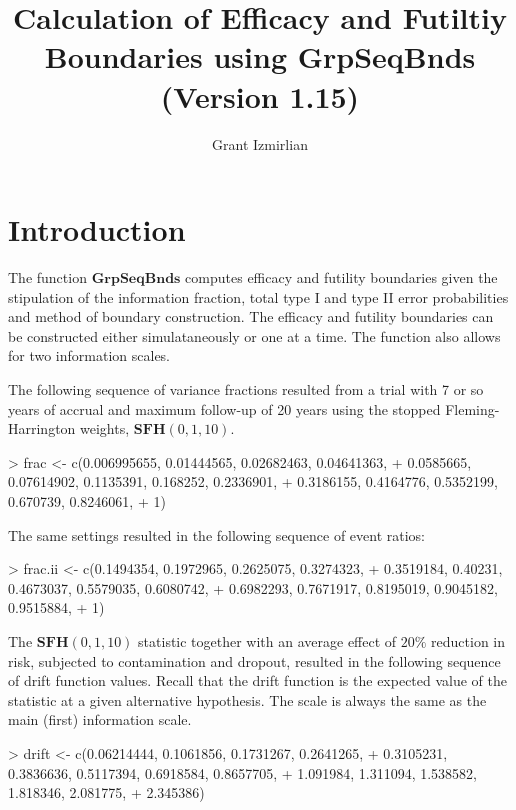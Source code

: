 \documentclass{article}
\begin{document}
\title{Calculation of Efficacy and Futiltiy Boundaries using GrpSeqBnds (Version 1.15)}
\author{Grant Izmirlian}
\maketitle

\section{Introduction}
The function $\mathbf{GrpSeqBnds}$ computes efficacy and futility boundaries given the
stipulation of the information fraction, total type I and type II error probabilities and method
of boundary construction.  The efficacy and futility boundaries can be constructed either
simulataneously or one at a time.  The function also allows for two information scales.



The following sequence of variance fractions resulted from a trial with 7 or so years of accrual
and maximum follow-up of 20 years using the stopped Fleming-Harrington weights, $\mathbf{SFH}(0,1,10)$.
\begin{Schunk}
\begin{Sinput}
> frac <- c(0.006995655, 0.01444565, 0.02682463, 0.04641363, 
+     0.0585665, 0.07614902, 0.1135391, 0.168252, 0.2336901, 
+     0.3186155, 0.4164776, 0.5352199, 0.670739, 0.8246061, 
+     1)
\end{Sinput}
\end{Schunk}

The same settings resulted in the following sequence of event ratios:

\begin{Schunk}
\begin{Sinput}
> frac.ii <- c(0.1494354, 0.1972965, 0.2625075, 0.3274323, 
+     0.3519184, 0.40231, 0.4673037, 0.5579035, 0.6080742, 
+     0.6982293, 0.7671917, 0.8195019, 0.9045182, 0.9515884, 
+     1)
\end{Sinput}
\end{Schunk}

The $\mathbf{SFH}(0,1,10)$ statistic together with an average effect of $20\%$
reduction in risk, subjected to contamination and dropout, resulted in the
following sequence of drift function values.  Recall that the drift function
is the expected value of the statistic at a given alternative hypothesis.  The
scale is always the same as the main (first) information scale.  

\begin{Schunk}
\begin{Sinput}
> drift <- c(0.06214444, 0.1061856, 0.1731267, 0.2641265, 
+     0.3105231, 0.3836636, 0.5117394, 0.6918584, 0.8657705, 
+     1.091984, 1.311094, 1.538582, 1.818346, 2.081775, 
+     2.345386)
\end{Sinput}
\end{Schunk}
\end{document}

